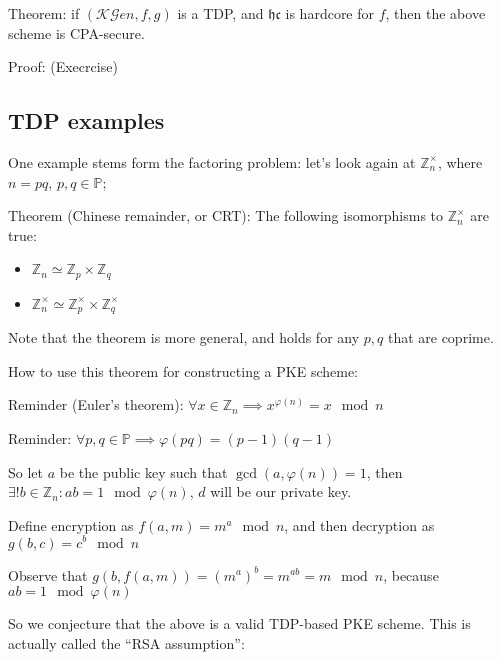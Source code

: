 Theorem: if $(\mathcal{KG}en, f, g)$ is a TDP, and $\mathfrak{hc}$ is hardcore for $f$, then the above scheme is CPA-secure.

Proof: (Execrcise)

\subsection{TDP examples}

One example stems form the factoring problem: let's look again at $\mathbb{Z}_n^\times$, where $n = pq$, $p, q \in \mathbb{P}$;

Theorem (Chinese remainder, or CRT): The following isomorphisms to $\mathbb{Z}_n^\times$ are true:

\begin{itemize}
    \item $\mathbb{Z}_n \simeq \mathbb{Z}_p \times \mathbb{Z}_q$
        \item $\mathbb{Z}_n^\times \simeq \mathbb{Z}_p^\times \times \mathbb{Z}_q^\times$
\end{itemize}

Note that the theorem is more general, and holds for any $p, q$ that are coprime.

How to use this theorem for constructing a PKE scheme:

Reminder (Euler's theorem): $\forall x \in \mathbb{Z}_n \implies x^{\varphi(n)} = x \mod n$

Reminder: $\forall p, q \in \mathbb{P} \implies \varphi(pq) = (p-1)(q-1)$

So let $a$ be the public key such that $\gcd(a, \varphi(n))=1$, then $\exists! b \in \mathbb{Z}_n : ab = 1 \mod \varphi(n)$, $d$ will be our private key.

Define encryption as $f(a, m) = m^a \mod n$, and then decryption as $g(b, c) = c^b \mod n$

Observe that $g(b, f(a, m)) = (m^a)^b = m^{ab} = m \mod n$, because $ab = 1 \mod \varphi(n)$

So we conjecture that the above is a valid TDP-based PKE scheme. This is actually called the ``RSA assumption'':

